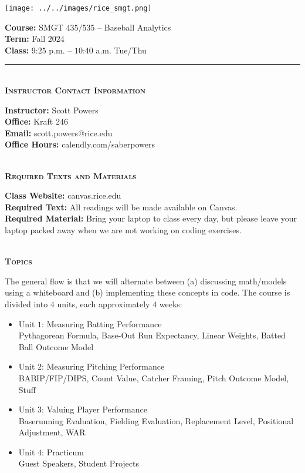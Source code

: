 \documentclass[11pt]{article}
\begin{document}
\begin{minipage}[c]{0.4\linewidth}
  \texttt{[image: ../../images/rice\_smgt.png]}
\end{minipage}
\begin{minipage}[c]{0.6\linewidth}
  \raggedleft
  {\bf Course:} SMGT $435/535$ -- Baseball Analytics\\
  {\bf Term:} Fall $2024$\\
  {\bf Class:} $9$:$25$ p.m. -- $10$:$40$ a.m. Tue/Thu
\end{minipage}

\hrule

~\\
\textbf{\textsc{Instructor Contact Information}}
\begin{adjustwidth}{1cm}{0cm}
	{\bf Instructor:} Scott Powers\\
  {\bf Office:} Kraft $246$\\
  {\bf Email:} scott.powers@rice.edu\\
  {\bf Office Hours:} calendly.com/saberpowers
\end{adjustwidth}

~\\
\textbf{\textsc{Required Texts and Materials}}
\begin{adjustwidth}{1cm}{0cm}
	{\bf Class Website:} canvas.rice.edu\\
	{\bf Required Text:} All readings will be made available on Canvas.\\
	{\bf Required Material:} Bring your laptop to class every day, but please leave your laptop packed away when we are not working on coding exercises.
\end{adjustwidth}

~\\
\textbf{\textsc{Topics}}
\begin{adjustwidth}{1cm}{0cm}
  The general flow is that we will alternate between (a) discussing math/models using a whiteboard and (b) implementing these concepts in code. The course is divided into $4$ units, each approximately $4$ weeks:
  \begin{itemize}
    \item Unit $1$: Measuring Batting Performance\\
    Pythagorean Formula, Base-Out Run Expectancy, Linear Weights, Batted Ball Outcome Model
    \item Unit $2$: Measuring Pitching Performance\\
    BABIP/FIP/DIPS, Count Value, Catcher Framing, Pitch Outcome Model, Stuff
    \item Unit $3$: Valuing Player Performance\\
    Baserunning Evaluation, Fielding Evaluation, Replacement Level, Positional Adjustment, WAR
    \item Unit $4$: Practicum\\
    Guest Speakers, Student Projects
  \end{itemize}
\end{adjustwidth}
\end{document}
